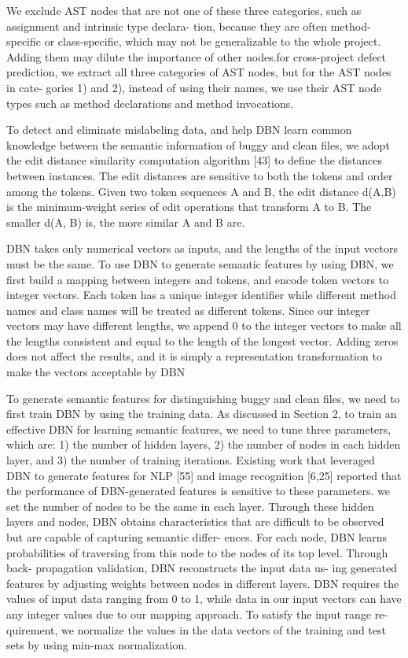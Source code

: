 \documentclass{article}
\begin{document}
We exclude AST nodes that are not one of these three categories, such as assignment and intrinsic type declara- tion, because they are often method-specific or class-specific, which may not be generalizable to the whole project. Adding them may dilute the importance of other nodes.for cross-project defect prediction, we extract all three categories of AST nodes, but for the AST nodes in cate- gories 1) and 2), instead of using their names, we use their AST node types such as method declarations and method invocations.


To detect and eliminate mislabeling data, and help DBN learn common knowledge between the semantic information of buggy and clean files, we adopt the edit distance similarity computation algorithm [43] to define the distances between instances. The edit distances are sensitive to both the tokens and order among the tokens. Given two token sequences A and B, the edit distance d(A,B) is the minimum-weight series of edit operations that transform A to B. The smaller d(A, B) is, the more similar A and B are.

DBN takes only numerical vectors as inputs, and the lengths of the input vectors must be the same. To use DBN to generate semantic features by using DBN, we first build a mapping between integers and tokens, and encode token vectors to integer vectors. Each token has a unique integer identifier while different method names and class names will be treated as different tokens. Since our integer vectors may have different lengths, we append 0 to the integer vectors to make all the lengths consistent and equal to the length of the longest vector. Adding zeros does not affect the results, and it is simply a representation transformation to make the vectors acceptable by DBN

To generate semantic features for distinguishing buggy and clean files, we need to first train DBN by using the training data. As discussed in Section 2, to train an effective DBN for learning semantic features, we need to tune three parameters, which are: 1) the number of hidden layers, 2) the number of nodes in each hidden layer, and 3) the number of training iterations. Existing work that leveraged DBN to generate features for NLP [55] and image recognition [6,25] reported that the performance of DBN-generated features is sensitive to these parameters. we set the number of nodes to be the same in each layer. Through these hidden layers and nodes, DBN obtains characteristics that are difficult to be observed but are capable of capturing semantic differ- ences. For each node, DBN learns probabilities of traversing from this node to the nodes of its top level. Through back- propagation validation, DBN reconstructs the input data us- ing generated features by adjusting weights between nodes in different layers.
DBN requires the values of input data ranging from 0 to 1, while data in our input vectors can have any integer values due to our mapping approach. To satisfy the input range re- quirement, we normalize the values in the data vectors of the training and test sets by using min-max normalization.
\end{document}
